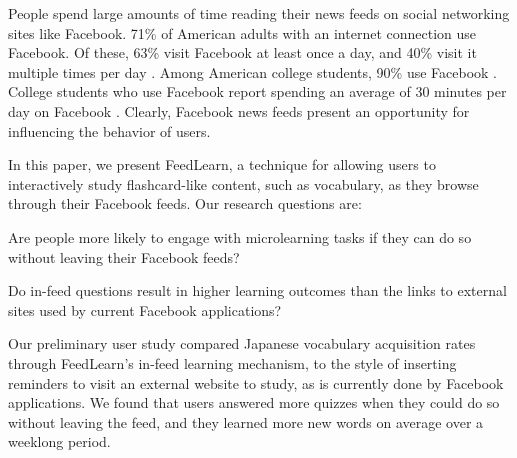 \documentclass{chi-ext}
\begin{document}
People spend large amounts of time reading their news feeds on social networking sites like Facebook.
71\% of American adults with an internet connection use Facebook. Of these, 63\% visit Facebook at least once a day, and 40\% visit it multiple times per day \cite{socialmediaupdate}. Among American college students, 90\% use Facebook \cite{collegefacebook2}. College students who use Facebook report spending an average of 30 minutes per day on Facebook \cite{collegefacebook}. Clearly, Facebook news feeds present an opportunity for influencing the behavior of users.

In this paper, we present FeedLearn, a technique for allowing users to interactively study flashcard-like content, such as vocabulary, as they browse through their Facebook feeds. Our research questions are:

\begin{compactitem}
\item Are people more likely to engage with microlearning tasks if they can do so without leaving their Facebook feeds?
\item Do in-feed questions result in higher learning outcomes than the links to external sites used by current Facebook applications?
\end{compactitem}

Our preliminary user study compared Japanese vocabulary acquisition rates through FeedLearn's in-feed learning mechanism, to the style of inserting reminders to visit an external website to study, as is currently done by Facebook applications. We found that users answered more quizzes when they could do so without leaving the feed, and they learned more new words on average over a weeklong period. %
\end{document}
